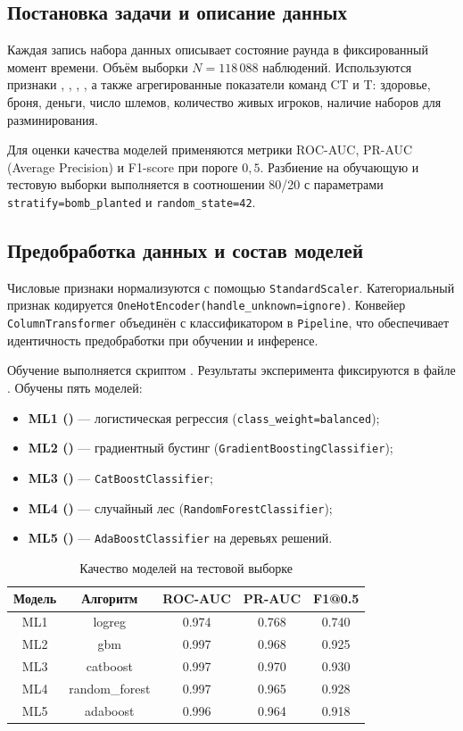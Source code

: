 \documentclass[14pt,a4paper]{extarticle}
\begin{document}
\subsection{Постановка задачи и описание данных}

Каждая запись набора данных описывает состояние раунда в фиксированный момент времени. Объём выборки $N = 118\,088$ наблюдений. Используются признаки , , , , а также агрегированные показатели команд CT и T: здоровье, броня, деньги, число шлемов, количество живых игроков, наличие наборов для разминирования.

Для оценки качества моделей применяются метрики ROC-AUC, PR-AUC (Average Precision) и F1-score при пороге $0{,}5$. Разбиение на обучающую и тестовую выборки выполняется в соотношении 80/20 с параметрами \texttt{stratify=bomb\_planted} и \texttt{random\_state=42}.

\subsection{Предобработка данных и состав моделей}

Числовые признаки нормализуются с помощью \texttt{StandardScaler}. Категориальный признак  кодируется \texttt{OneHotEncoder(handle\_unknown=ignore)}. Конвейер \texttt{ColumnTransformer} объединён с классификатором в \texttt{Pipeline}, что обеспечивает идентичность предобработки при обучении и инференсе.

Обучение выполняется скриптом . Результаты эксперимента фиксируются в файле . Обучены пять моделей:
\begin{itemize}
  \item \textbf{ML1 ()} --- логистическая регрессия (\texttt{class\_weight=balanced});
  \item \textbf{ML2 ()} --- градиентный бустинг (\texttt{GradientBoostingClassifier});
  \item \textbf{ML3 ()} --- \texttt{CatBoostClassifier};
  \item \textbf{ML4 ()} --- случайный лес (\texttt{RandomForestClassifier});
  \item \textbf{ML5 ()} --- \texttt{AdaBoostClassifier} на деревьях решений.
\end{itemize}

\begin{table}[H]
\centering
\caption{Качество моделей на тестовой выборке}
\begin{tabular}{|c|c|c|c|c|}
\hline
Модель & Алгоритм & ROC-AUC & PR-AUC & F1@0.5 \\
\hline
ML1 & logreg & 0.974 & 0.768 & 0.740 \\
ML2 & gbm & 0.997 & 0.968 & 0.925 \\
ML3 & catboost & 0.997 & 0.970 & 0.930 \\
ML4 & random\_forest & 0.997 & 0.965 & 0.928 \\
ML5 & adaboost & 0.996 & 0.964 & 0.918 \\
\hline
\end{tabular}
\end{table}
\end{document}
